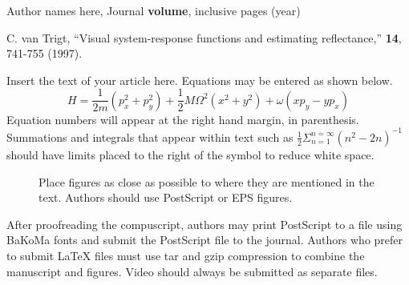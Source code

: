 %
%

\begin{OEReferences}
\item  Author names here,  
Journal {\bf volume}, inclusive pages (year)
\item  C. van Trigt, ``Visual system-response
 functions and estimating  reflectance,'' \josaa
 {\bf 14}, 741-755 (1997).
\end{OEReferences}

\noindent
Insert the text of your article here.  Equations may be 
entered as shown below.
\begin{equation}
H = \frac{1}{2m}(p_x^2 + p_y^2) + \frac{1}{2} M{\Omega}^2
     (x^2 + y^2) + \omega (xp_y - yp_x)
\end{equation}
Equation numbers will appear at the right hand margin, 
in parenthesis. Summations and integrals that appear 
within text such as  $\frac{1}{2}{\Sigma } 
 _{n=1}^{n=\infty} (n^2 - 2n)^{-1}$ 
should have limits placed to the 
right of the symbol to reduce white space.

 

\begin{figure} 
\centerline{ \epsfxsize=3in }
\caption{Place figures as close as 
possible to where they are mentioned in the text. 
Authors should use PostScript or EPS figures.}
\end{figure}



After proofreading the compuscript, authors may print  
PostScript to a file using BaKoMa fonts and submit the 
PostScript file to the journal.  Authors who prefer to
submit LaTeX files must use tar and gzip compression
to combine the manuscript and figures.  Video should
always be submitted as separate files.

